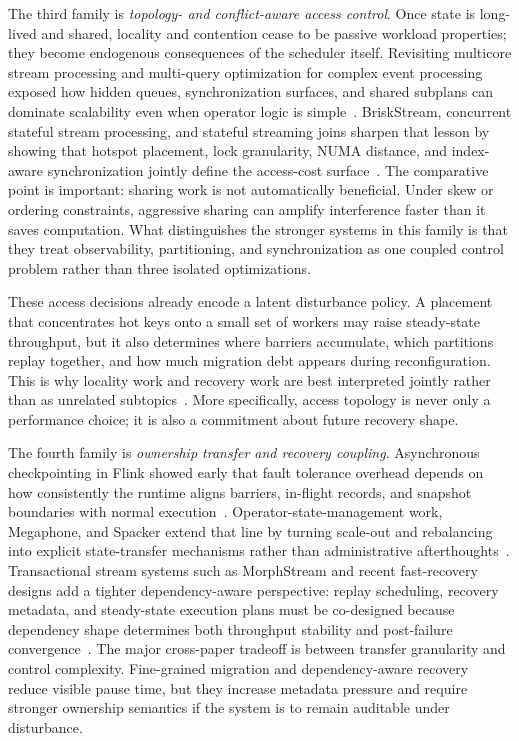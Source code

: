 \documentclass[acmsmall,screen,review]{acmart}
\begin{document}
The third family is 
\emph{topology- and conflict-aware access control}. Once state is long-lived and shared, locality and contention cease to be passive workload properties; they become endogenous consequences of the scheduler itself. Revisiting multicore stream processing and multi-query optimization for complex event processing exposed how hidden queues, synchronization surfaces, and shared subplans can dominate scalability even when operator logic is simple~\cite{zhang2017revisiting,zhang2017mqo}. BriskStream, concurrent stateful stream processing, and stateful streaming joins sharpen that lesson by showing that hotspot placement, lock granularity, NUMA distance, and index-aware synchronization jointly define the access-cost surface~\cite{zhang2019briskstream,zhang2020concurrent,zhang2023openmldb}. The comparative point is important: sharing work is not automatically beneficial. Under skew or ordering constraints, aggressive sharing can amplify interference faster than it saves computation. What distinguishes the stronger systems in this family is that they treat observability, partitioning, and synchronization as one coupled control problem rather than three isolated optimizations.

These access decisions already encode a latent disturbance policy. A placement that concentrates hot keys onto a small set of workers may raise steady-state throughput, but it also determines where barriers accumulate, which partitions replay together, and how much migration debt appears during reconfiguration. This is why locality work and recovery work are best interpreted jointly rather than as unrelated subtopics~\cite{zhang2019briskstream,zhang2020concurrent,carbone2015asynchronous,zhao2024recovery,mao2025spacker}. More specifically, access topology is never only a performance choice; it is also a commitment about future recovery shape.

The fourth family is 
\emph{ownership transfer and recovery coupling}. Asynchronous checkpointing in Flink showed early that fault tolerance overhead depends on how consistently the runtime aligns barriers, in-flight records, and snapshot boundaries with normal execution~\cite{carbone2015asynchronous}. Operator-state-management work, Megaphone, and Spacker extend that line by turning scale-out and rebalancing into explicit state-transfer mechanisms rather than administrative afterthoughts~\cite{fernandez2013osm,nasir2019megaphone,mao2025spacker}. Transactional stream systems such as MorphStream and recent fast-recovery designs add a tighter dependency-aware perspective: replay scheduling, recovery metadata, and steady-state execution plans must be co-designed because dependency shape determines both throughput stability and post-failure convergence~\cite{mao2023morphstream,zhao2024recovery}. The major cross-paper tradeoff is between transfer granularity and control complexity. Fine-grained migration and dependency-aware recovery reduce visible pause time, but they increase metadata pressure and require stronger ownership semantics if the system is to remain auditable under disturbance.
\end{document}
